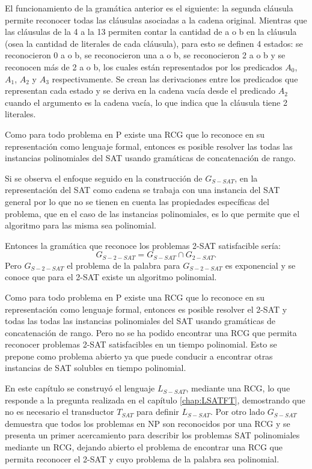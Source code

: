 El funcionamiento de la gramática anterior es el siguiente: la segunda cláusula permite reconocer todas las
cláusulas asociadas a la cadena original. Mientras que las cláusulas de la 4 a la 13 permiten contar
la cantidad de a o b en la cláusula (osea la cantidad de literales de cada cláusula), para esto se definen
4 estados: se reconocieron 0 a o b, se reconocieron una a o b, se reconocieron 2 a o b y se reconocen
más de 2 a o b, los cuales están representados por los predicados $A_0$, $A_1$, $A_2$ y $A_3$ respectivamente.
Se crean las derivaciones entre los predicados que representan cada estado y se deriva en la cadena vacía
desde el predicado $A_2$ cuando el argumento es la cadena vacía, lo que indica que la cláusula tiene 2 literales.


Como para todo problema en P existe una RCG que lo reconoce en su representación como lenguaje formal,
entonces es posible resolver las todas las instancias polinomiales del SAT usando gramáticas de
concatenación de rango.

Si se observa el enfoque seguido en la construcción de $G_{S-SAT}$, en la representación del SAT como cadena se
trabaja con una instancia del SAT general por lo que no se tienen en cuenta las propiedades específicas
del problema, que en el caso de las instancias polinomiales, es lo que permite que el algoritmo para las
misma sea polinomial.

Entonces la gramática que reconoce los problemas 2-SAT satisfacible sería:
$$G_{S-2-SAT}=G_{S-SAT}\cap G_{2-SAT}.$$
Pero $G_{S-2-SAT}$ el problema de la palabra para $G_{S-2-SAT}$ es exponencial y se conoce que para el 2-SAT
existe un algoritmo polinomial.

Como para todo problema en P existe una RCG que lo reconoce en su representación como lenguaje formal,
entonces es posible resolver el 2-SAT y todas las todas las instancias polinomiales del SAT usando gramáticas de
concatenación de rango. Pero no se ha podido encontrar una RCG que permita reconocer problemas 2-SAT satisfacibles
en un tiempo polinomial. Esto se prepone como problema abierto ya que puede conducir a encontrar otras instancias
de SAT solubles en tiempo polinomial.

En este capítulo se construyó el lenguaje $L_{S-SAT}$, mediante una RCG, lo que responde a la pregunta realizada en
el capítulo \ref{chap:LSATFT}, demostrando que no es necesario el transductor $T_{SAT}$ para definir $L_{S-SAT}$. Por otro
lado $G_{S-SAT}$ demuestra que todos los problemas en NP son reconocidos por una RCG y se presenta un primer acercamiento
para describir los problemas SAT polinomiales mediante un RCG, dejando abierto el problema de encontrar una RCG
que permita reconocer el 2-SAT y cuyo problema de la palabra sea polinomial.
